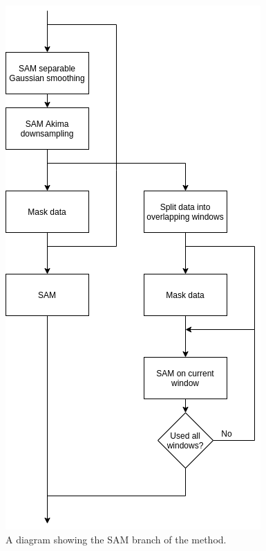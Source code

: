                 \begin{figure}
                    \centering
                    
                    \includegraphics[width=0.7\linewidth]{figures/pca_data_driven_surrogate_signal_extraction_methods_for_dynamic_pet_methods_data_driven_surrogate_signal_extraction_sam.png}
                    
                    \captionsetup{singlelinecheck=false, justification=centering}
                    \caption{A diagram showing the \gls{SAM} branch of the method.}
                    \label{fig:pca_data_driven_surrogate_signal_extraction_methods_for_dynamic_pet_methods_data_driven_surrogate_signal_extraction_sam}
                \end{figure}
                

